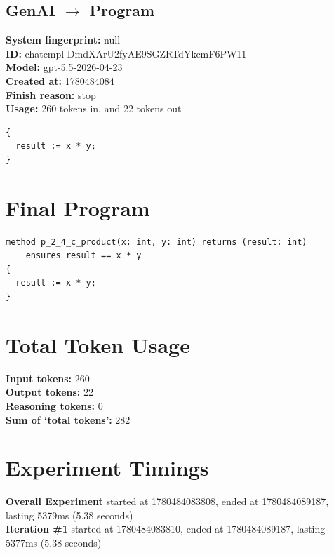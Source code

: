 \documentclass{article}
\begin{document}
\subsection*{GenAI $\rightarrow$ Program}
\textbf{System fingerprint: }null
\\\textbf{ID: }chatcmpl-DmdXArU2fyAE9SGZRTdYkcmF6PW11
\\\textbf{Model: }gpt-5.5-2026-04-23
\\\textbf{Created at: }1780484084
\\\textbf{Finish reason: }stop
\\\textbf{Usage: }260 tokens in, and 22 tokens out
\begin{lstlisting}
{
  result := x * y;
}
\end{lstlisting}
\section*{Final Program}
\begin{lstlisting}
method p_2_4_c_product(x: int, y: int) returns (result: int)
	ensures result == x * y
{
  result := x * y;
}
\end{lstlisting}
\section*{Total Token Usage}
\textbf{Input tokens: }260
\\\textbf{Output tokens: }22
\\\textbf{Reasoning tokens: }0
\\\textbf{Sum of `total tokens': }282
\section*{Experiment Timings}
\textbf{Overall Experiment} started at 1780484083808, ended at 1780484089187, lasting 5379ms (5.38 seconds)
\\\textbf{Iteration \#1} started at 1780484083810, ended at 1780484089187, lasting 5377ms (5.38 seconds)
\end{document}
